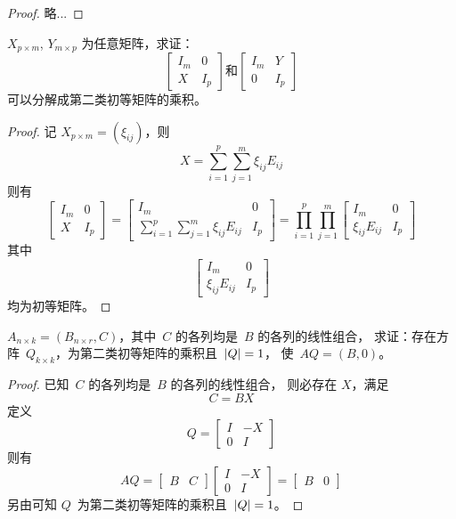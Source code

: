 \documentclass[twoside,openright]{book}
\begin{document}
\begin{CJK*}{UTF8}{}
\begin{quest}[初等变换]
\label{quest:20}
\end{quest}
\begin{proof}
略...
\end{proof}

\begin{quest}
\label{quest:21}
$X_{p\times m}$, $Y_{m\times p}$ 为任意矩阵，求证：
\[
\begin{bmatrix}
I_m & 0   \\
X   & I_p
\end{bmatrix}
\text{和}
\begin{bmatrix}
I_m & Y   \\
0   & I_p
\end{bmatrix}
\]
可以分解成第二类初等矩阵的乘积。
\end{quest}
\begin{proof}
记 $X_{p \times m}=(\xi_{ij})$，则
\[
X = \sum^p_{i=1} \sum^m_{j=1} \xi_{ij} E_{ij}
\]
则有
\[
\begin{bmatrix}
I_m & 0   \\
X   & I_p
\end{bmatrix} =
\begin{bmatrix}
I_m & 0   \\
\sum^p_{i=1} \sum^m_{j=1} \xi_{ij} E_{ij} & I_p
\end{bmatrix} =
\prod^p_{i=1} \prod^m_{j=1}
\begin{bmatrix}
I_m & 0   \\
\xi_{ij} E_{ij} & I_p
\end{bmatrix}
\]
其中
\[
\begin{bmatrix}
I_m & 0   \\
\xi_{ij} E_{ij} & I_p
\end{bmatrix}
\]
均为初等矩阵。
\end{proof}

\begin{quest}
\label{quest:22}
$A_{n\times k}=(B_{n\times r},C)$，其中\ $C$ 的各列均是\ $B$ 的各列的线性组合，
求证：存在方阵\ $Q_{k\times k}$，为第二类初等矩阵的乘积且\ $\lvert{Q}\rvert=1$，
使\ $AQ=(B,0)$。
\end{quest}
\begin{proof}
已知\ $C$ 的各列均是\ $B$ 的各列的线性组合，
则必存在 $X$，满足
\[
C = BX
\]
定义
\[
Q =
\begin{bmatrix}
I & -X \\
0 & I
\end{bmatrix}
\]
则有
\[
AQ=
\begin{bmatrix}
B & C
\end{bmatrix}
\begin{bmatrix}
I & -X \\
0 & I
\end{bmatrix}=
\begin{bmatrix}
B & 0
\end{bmatrix}
\]
另由{}可知 $Q$\ 为第二类初等矩阵的乘积且\ $\lvert{Q}\rvert=1$。
\end{proof}


\end{CJK*}
\end{document}
